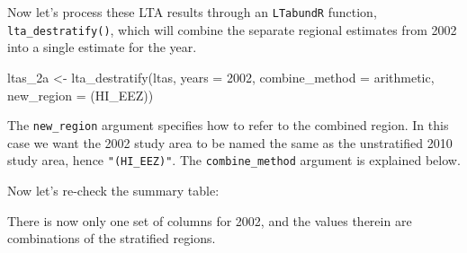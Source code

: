 \documentclass[
]{book}
\newenvironment{Shaded}{\begin{snugshade}}{\end{snugshade}}
\newcommand{\AttributeTok}[1]{\textcolor[rgb]{0.77,0.63,0.00}{#1}}
\newcommand{\ConstantTok}[1]{\textcolor[rgb]{0.00,0.00,0.00}{#1}}
\newcommand{\DecValTok}[1]{\textcolor[rgb]{0.00,0.00,0.81}{#1}}
\newcommand{\FloatTok}[1]{\textcolor[rgb]{0.00,0.00,0.81}{#1}}
\newcommand{\FunctionTok}[1]{\textcolor[rgb]{0.00,0.00,0.00}{#1}}
\newcommand{\NormalTok}[1]{#1}
\newcommand{\OtherTok}[1]{\textcolor[rgb]{0.56,0.35,0.01}{#1}}
\newcommand{\SpecialCharTok}[1]{\textcolor[rgb]{0.00,0.00,0.00}{#1}}
\newcommand{\StringTok}[1]{\textcolor[rgb]{0.31,0.60,0.02}{#1}}
\begin{document}
Now let's process these LTA results through an \texttt{LTabundR} function, \texttt{lta\_destratify()}, which will combine the separate regional estimates from 2002 into a single estimate for the year.

\begin{Shaded}
\begin{Highlighting}[]
\NormalTok{ltas\_2a }\OtherTok{\textless{}{-}}
  \FunctionTok{lta\_destratify}\NormalTok{(ltas,}
               \AttributeTok{years =} \DecValTok{2002}\NormalTok{,}
               \AttributeTok{combine\_method =} \StringTok{\textquotesingle{}arithmetic\textquotesingle{}}\NormalTok{,}
               \AttributeTok{new\_region =} \StringTok{\textquotesingle{}(HI\_EEZ)\textquotesingle{}}\NormalTok{)}
\end{Highlighting}
\end{Shaded}

The \texttt{new\_region} argument specifies how to refer to the combined region. In this case we want the 2002 study area to be named the same as the unstratified 2010 study area, hence \texttt{"(HI\_EEZ)"}. The \texttt{combine\_method} argument is explained below.

Now let's re-check the summary table:

\begin{Shaded}
\end{Shaded}

There is now only one set of columns for 2002, and the values therein are combinations of the stratified regions.
\end{document}
